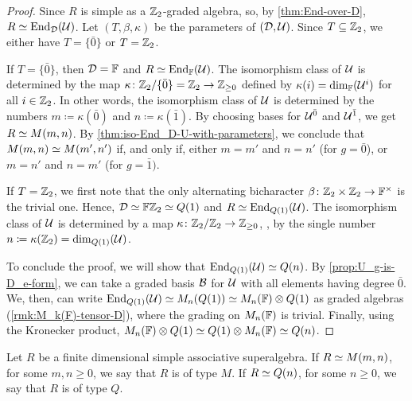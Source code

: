 \begin{proof}
    Since $R$ is simple as a $\mathbb{Z}_2$-graded algebra, so, by \cref{thm:End-over-D}, $R \simeq \operatorname{End}_{\mathcal{D}} (\mathcal U)$. 
    Let $(T, \beta, \kappa)$ be the parameters of $(\mathcal{D}, \mathcal U)$. 
    Since $T\subseteq \mathbb{Z}_2$, we either have $T = \{ \bar 0\}$ or $T = \mathbb{Z}_2$. 
    
    If $T = \{\bar 0\}$, then $\mathcal{D} = \mathbb{F}$ and $R \simeq \operatorname{End}_{\mathbb{F}} (\mathcal U)$. 
    The isomorphism class of $\mathcal U$ is determined by the map $\kappa\colon \mathbb{Z}_2/\{\bar 0\} = \mathbb{Z}_2 \to \mathbb{Z}_{\geq 0}$ defined by $\kappa(i) = \dim_{\mathbb{F}} (\mathcal U^i)$ for all $i\in \mathbb{Z}_2$. 
    In other words, the isomorphism class of $\mathcal U$ is determined by the numbers $m \coloneqq \kappa(\bar 0)$ and $n \coloneqq \kappa(\bar 1)$. 
    By choosing bases for $\mathcal U^{\bar0}$ and $\mathcal U^{\bar1}$, we get $R \simeq M(m,n)$. 
    By \cref{thm:iso-End_D-U-with-parameters}, we conclude that $M(m,n) \simeq M(m',n')$ if, and only if, either $m=m'$ and $n=n'$ (for $g = \bar 0$), or $m=n'$ and $n=m'$ (for $g = \bar 1)$. 
    
    If $T = \mathbb{Z}_2$, we first note that the only alternating bicharacter $\beta\colon \mathbb{Z}_2\times \mathbb{Z}_2 \to \mathbb{F}^\times$ is the trivial one. 
    Hence, $\mathcal{D} \simeq \mathbb{F}\mathbb{Z}_2 \simeq Q(1)$ and $R \simeq \operatorname{End}_{Q(1)}(\mathcal U)$. 
    The isomorphism class of $\mathcal U$ is determined by a map $\kappa\colon \mathbb{Z}_2/\mathbb{Z}_2 \to \mathbb{Z}_{\geq 0}$, \ie, by the single number $n \coloneqq \kappa(\mathbb{Z}_2) = \dim_{Q(1)} (\mathcal U)$. 
    
    To conclude the proof, we will show that $\operatorname{End}_{Q(1)}(\mathcal U) \simeq Q(n)$.  
    By \cref{prop:U_g-is-D_e-form}, we can take a graded basis $\mathcal B$ for $\mathcal U$ with all elements having degree $\bar 0$.
    We, then, can write $\operatorname{End}_{Q(1)}(\mathcal U) \simeq M_n(Q(1)) \simeq M_n(\mathbb{F}) \otimes Q(1)$ as graded algebras (\cref{rmk:M_k(F)-tensor-D}), where the grading on $M_n(\mathbb{F})$ is trivial. 
    Finally, using the Kronecker product, $M_n(\mathbb{F}) \otimes Q(1) \simeq Q(1)\otimes M_n(\mathbb{F}) \simeq Q(n)$. 
\end{proof}

\begin{defi}
    Let $R$ be a finite dimensional simple associative superalgebra. 
    If $R \simeq M(m,n)$, for some $m,n \geq 0$, we say that $R$ is of type $M$. 
    If $R \simeq Q(n)$, for some $n \geq 0$, we say that $R$ is of type $Q$. 
\end{defi}